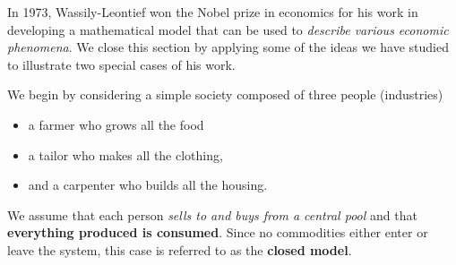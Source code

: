 In 1973, Wassily-Leontief won the Nobel prize in economics for his work in developing a mathematical model that can be used to \emph{describe various economic phenomena}.
We close this section by applying some of the ideas we have studied to illustrate two special cases of his work.

We begin by considering a simple society composed of three people
(industries)
\begin{itemize}
\item a farmer who grows all the food
\item a tailor who makes all the clothing,
\item and a carpenter who builds all the housing. 
\end{itemize}
We assume that each person \emph{sells to and buys from a central pool} and that \textbf{everything produced is consumed}.
Since no commodities either enter or leave the system, this case is referred to as the \textbf{closed model}.

